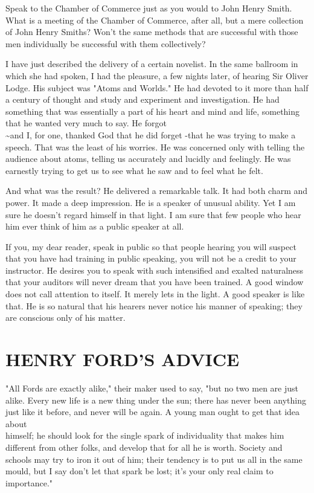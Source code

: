 \documentclass[10pt]{article}
\begin{document}
Speak to the Chamber of Commerce just as you would to John Henry Smith. What is a meeting of the Chamber of Commerce, after all, but a mere collection of John Henry Smiths? Won't the same methods that are successful with those men individually be successful with them collectively?

I have just described the delivery of a certain novelist. In the same ballroom in which she had spoken, I had the pleasure, a few nights later, of hearing Sir Oliver Lodge. His subject was "Atoms and Worlds." He had devoted to it more than half a century of thought and study and experiment and investigation. He had something that was essentially a part of his heart and mind and life, something that he wanted very much to say. He forgot\\
\~{}and I, for one, thanked God that he did forget -that he was trying to make a speech. That was the least of his worries. He was concerned only with telling the audience about atoms, telling us accurately and lucidly and feelingly. He was earnestly trying to get us to see what he saw and to feel what he felt.

And what was the result? He delivered a remarkable talk. It had both charm and power. It made a deep impression. He is a speaker of unusual ability. Yet I am sure he doesn't regard himself in that light. I am sure that few people who hear him ever think of him as a public speaker at all.

If you, my dear reader, speak in public so that people hearing you will suspect that you have had training in public speaking, you will not be a credit to your instructor. He desires you to speak with such intensified and exalted naturalness that your auditors will never dream that you have been trained. A good window does not call attention to itself. It merely lets in the light. A good speaker is like that. He is so natural that his hearers never notice his manner of speaking; they are conscious only of his matter.

\section*{HENRY FORD'S ADVICE}
"All Fords are exactly alike," their maker used to say, "but no two men are just alike. Every new life is a new thing under the sun; there has never been anything just like it before, and never will be again. A young man ought to get that idea about\\
himself; he should look for the single spark of individuality that makes him different from other folks, and develop that for all he is worth. Society and schools may try to iron it out of him; their tendency is to put us all in the same mould, but I say don't let that spark be lost; it's your only real claim to importance."
\end{document}
